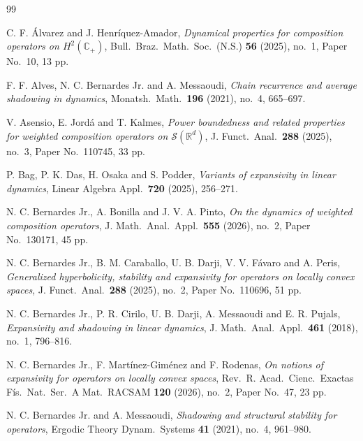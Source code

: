 \documentclass[12pt]{article}
\theoremstyle{plain}
\theoremstyle{definition}
\newcommand{\R}{\mathbb{R}} %
\newcommand{\C}{\mathbb{C}} %
\begin{document}

\begin{thebibliography}{99}

 C. F. \'Alvarez and J. Henr\'iquez-Amador,
    {\it Dynamical properties for composition operators on $H^2(\C_+)$}, 
    Bull.\ Braz.\ Math.\ Soc.\ (N.S.) {\bf 56} (2025), no.\ 1, Paper No.\ 10, 13 pp.

 F. F. Alves, N. C. Bernardes Jr. and A. Messaoudi,
    {\it Chain recurrence and average shadowing in dynamics}, Monatsh.\ Math.\ {\bf 196} (2021), no.\ 4, 665--697.

 V. Asensio, E. Jord\'a and T. Kalmes,
    {\it Power boundedness and related properties for weighted composition operators on $\mathcal{S}(\R^d)$},
    J. Funct.\ Anal.\ {\bf 288} (2025), no.\ 3, Paper No.\ 110745, 33 pp.

 P. Bag, P. K. Das, H. Osaka and S. Podder,
    {\it Variants of expansivity in linear dynamics}, Linear Algebra Appl.\ {\bf 720} (2025), 256--271.

 N. C. Bernardes Jr., A. Bonilla and J. V. A. Pinto,
    {\it On the dynamics of weighted composition operators}, J. Math.\ Anal.\ Appl.\ {\bf 555} (2026), no.\ 2, Paper No.\ 130171, 45 pp.

 N. C. Bernardes Jr., B. M. Caraballo, U. B. Darji, V. V. F\'avaro and A. Peris,
    {\it Generalized hyperbolicity, stability and expansivity for operators on locally convex spaces}, 
    J. Funct.\ Anal.\ {\bf 288} (2025), no.\ 2, Paper No.\ 110696, 51 pp.

 N. C. Bernardes Jr., P. R. Cirilo, U. B. Darji, A. Messaoudi and E. R. Pujals,
    {\it Expansivity and shadowing in linear dynamics}, J. Math.\ Anal.\ Appl.\ {\bf 461} (2018), no.\ 1, 796--816.

 N. C. Bernardes Jr., F. Mart\'inez-Gim\'enez and F. Rodenas,
    {\it On notions of expansivity for operators on locally convex spaces}, 
    Rev.\ R. Acad.\ Cienc.\ Exactas F\'is.\ Nat.\ Ser.\ A Mat.\ RACSAM {\bf 120} (2026), no.\ 2, Paper No.\ 47, 23 pp.

 N. C. Bernardes Jr. and A. Messaoudi,
    {\it Shadowing and structural stability for operators}, Ergodic Theory Dynam.\ Systems {\bf 41} (2021), no.\ 4, 961--980.


\end{thebibliography}
\end{document}
